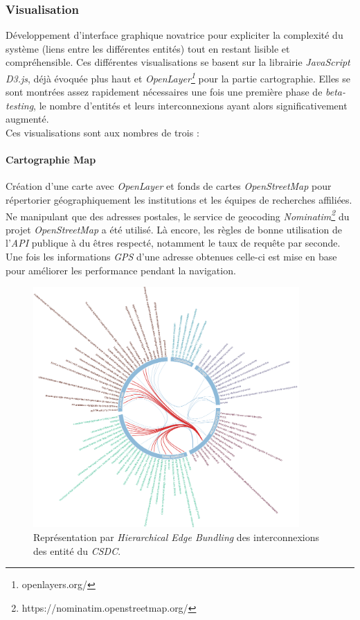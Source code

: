 \documentclass[french, 11pt]{memoir}
\begin{document}
\subsubsection{Visualisation}\label{visualisation-1}

Développement d'interface graphique novatrice pour
expliciter la complexité du système (liens entre les différentes
entités) tout en restant lisible et compréhensible. Ces différentes
visualisations se basent sur la librairie \emph{JavaScript D3.js}, déjà
évoquée plus haut et \emph{OpenLayer\footnote{openlayers.org/}} pour la partie cartographie. Elles
se sont montrées assez rapidement nécessaires une fois une première
phase de \emph{beta-testing}, le nombre d'entités et leurs
interconnexions ayant alors significativement augmenté.\\ 
Ces visualisations sont aux nombres de trois :

\paragraph{Cartographie Map}\label{cartographie-map}

Création d'une carte avec \emph{OpenLayer} et fonds de cartes
\emph{OpenStreetMap} pour répertorier géographiquement les institutions
et les équipes de recherches affiliées. Ne manipulant que des adresses
postales, le service de geocoding \emph{Nominatim\footnote{https://nominatim.openstreetmap.org/}} du projet
\emph{OpenStreetMap} a été utilisé. Là encore, les règles de bonne
utilisation de l'\emph{API} publique à du êtres respecté, notamment le
taux de requête par seconde. Une fois les informations \emph{GPS} d'une
adresse obtenues celle-ci est mise en base pour améliorer les performance pendant la navigation.

\begin{figure}[htbp]
	\begin{center}
		\includegraphics[width=4in]{img/csdcDaisy.png}
		\caption{Représentation par \textit{Hierarchical Edge Bundling} des interconnexions des entité du \textit{CSDC}.}
	\end{center}
\end{figure}
\end{document}
